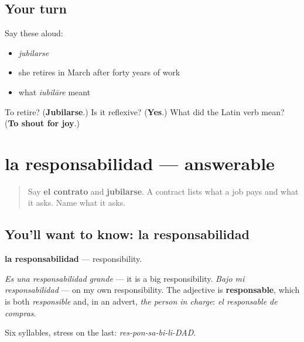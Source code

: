 \subsection*{Your turn}
Say these aloud:

\begin{itemize}
\raggedright
  \item \emph{jubilarse}
  \item she retires in March after forty years of work
  \item what \emph{iubilāre} meant
\end{itemize}

\begin{tcolorbox}[breakable,colback=teal!4,colframe=teal!35!black,title={Before you move on}]
To retire? (\textbf{Jubilarse}.) Is it reflexive? (\textbf{Yes}.) What did the Latin verb mean? (\textbf{To shout for joy}.)
\end{tcolorbox}
\section[la responsabilidad]{la responsabilidad — answerable}

\label{lesson:ES-C445-responsabilidad}



\begin{quote}
Say \textbf{el contrato} and \textbf{jubilarse}. A contract lists what a job pays and what it asks. Name what it asks.
\end{quote}

\subsection*{You'll want to know: la responsabilidad}
\textbf{la responsabilidad} — responsibility.

\emph{Es una responsabilidad grande} — it is a big responsibility. \emph{Bajo mi responsabilidad} — on my own responsibility. The adjective is \textbf{responsable}, which is both \emph{responsible} and, in an advert, \emph{the person in charge}: \emph{el responsable de compras}.

Six syllables, stress on the last: \emph{res-pon-sa-bi-li-DAD}.

